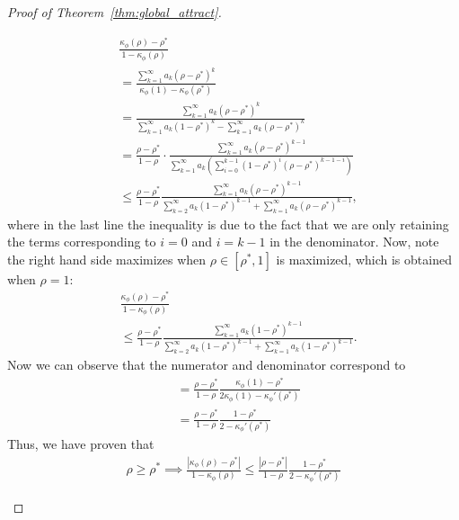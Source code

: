 \documentclass[twoside]{article}
\newcommand{\km}{\kappa_\phi}
\theoremstyle{definition}
\begin{document}
\begin{proof}[Proof of Theorem~\ref{thm:global_attract}]
\begin{itemize}
\begin{align*}
&\frac{\km(\rho)-\rho^*}{1-\km(\rho)} \\
&= \frac{\sum_{k=1}^\infty a_k (\rho-\rho^*)^k}{\km(1)- \km(\rho^*)}\\
&= \frac{\sum_{k=1}^\infty a_k (\rho-\rho^*)^k}{\sum_{k=1}^\infty a_k (1-\rho^*)^k - \sum_{k=1}^\infty a_k (\rho-\rho^*)^k}  \\
&= \frac{\rho-\rho^*}{1-\rho}\cdot\frac{\sum_{k=1}^\infty a_k (\rho-\rho^*)^{k-1}}{\sum_{k=1}^\infty a_k (\sum_{i=0}^{k-1}(1-\rho^*)^i(\rho-\rho^*)^{k-1-i})}\\
&\le \frac{\rho-\rho^*}{1-\rho}\frac{\sum_{k=1}^\infty a_k (\rho-\rho^*)^{k-1}}{\sum_{k=2}^\infty a_k (1-\rho^*)^{k-1} + \sum_{k=1}^\infty a_k (\rho-\rho^*)^{k-1}},
\end{align*}
where in the last line the inequality is due to the fact that we are only retaining the terms corresponding to $i=0$ and $i=k-1$ in the denominator.
Now, note the right hand side maximizes when $\rho\in[\rho^*,1]$ is maximized, which is obtained when $\rho=1$:
\begin{align*}
&\frac{\km(\rho)-\rho^*}{1-\km(\rho)}\\
&\le \frac{\rho-\rho^*}{1-\rho}\frac{\sum_{k=1}^\infty a_k (1-\rho^*)^{k-1}}{\sum_{k=2}^\infty a_k (1-\rho^*)^{k-1} + \sum_{k=1}^\infty a_k (1-\rho^*)^{k-1}}.
\end{align*}
Now we can observe that the numerator and denominator correspond to 
\begin{align*}
    &=\frac{\rho-\rho^*}{1-\rho}\frac{\km(1)-\rho^*}{2\km(1)-\km'(\rho^*)}\\
&=\frac{\rho-\rho^*}{1-\rho}\frac{1-\rho^*}{2-\km'(\rho^*)}
\end{align*}
Thus, we have proven that 
\begin{align*}
\rho \ge \rho^* \implies \frac{|\km(\rho)-\rho^*|}{1-\km(\rho)} \le \frac{|\rho-\rho^*|}{1-\rho} \frac{1-\rho^*}{2-\km'(\rho^*)}
\end{align*}


\end{itemize}
\end{proof}
\end{document}
